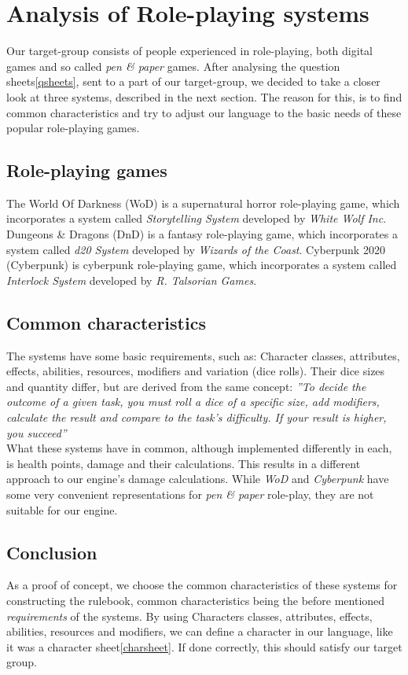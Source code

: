 \section{Analysis of Role-playing systems}
Our target-group consists of people experienced in role-playing, both digital games and so called \emph{pen \& paper} games.	After analysing the question sheets\vref{qsheets}, sent to a part of our target-group, we decided to take a closer look at three systems, described in the next section. The reason for this, is to find common characteristics and try to adjust our language to the basic needs of these popular role-playing games.

\subsection*{Role-playing games}
The World Of Darkness (WoD) is a supernatural horror role-playing game, which incorporates a system called \emph{Storytelling System} developed by \emph{White Wolf Inc}.\cite{wod}
Dungeons \& Dragons (DnD) is a fantasy role-playing game, which incorporates a system called \emph{d20 System} developed by \emph{Wizards of the Coast}.\cite{dnd}
Cyberpunk 2020 (Cyberpunk) is cyberpunk role-playing game, which incorporates a system called \emph{Interlock System} developed by \emph{R. Talsorian Games}.\cite{cyberpunk}

\subsection*{Common characteristics}
\label{baseclasses}
The systems have some basic requirements, such as:
Character classes, attributes, effects, abilities, resources, modifiers and variation (dice rolls).
Their dice sizes and quantity differ, but are derived from the same concept: \textit{''To decide the outcome of a given task, you must roll a dice of a specific size, add modifiers, calculate the result and compare to the task's difficulty. If your result is higher, you succeed''}\\

What these systems have in common, although implemented differently in each, is health points, damage and their calculations. This results in a different approach to our engine's damage calculations. While \emph{WoD} and \emph{Cyberpunk} have some very convenient representations for \emph{pen \& paper} role-play, they are not suitable for our engine.

\subsection*{Conclusion}
As a proof of concept, we choose the common characteristics of these systems for constructing the rulebook, common characteristics being the before mentioned \emph{requirements} of the systems.
By using Characters classes, attributes, effects, abilities, resources and modifiers, we can define a character in our language, like it was a character sheet\vref{charsheet}. If done correctly, this should satisfy our target group.

